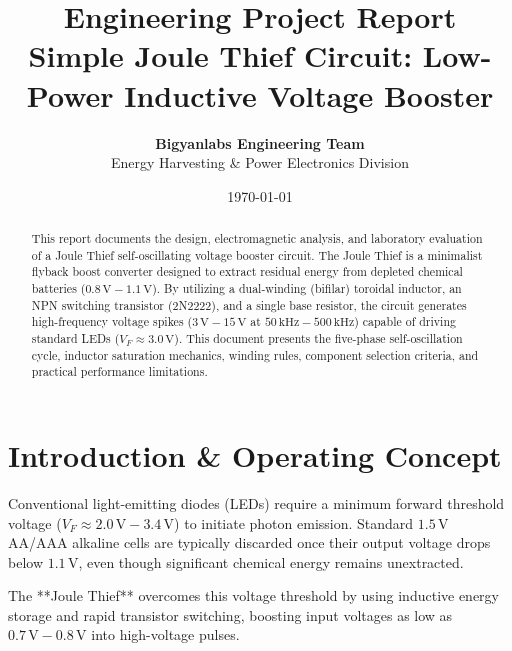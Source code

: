 \documentclass[11pt,a4paper]{article}
\title{\textbf{\Huge Engineering Project Report}\\[0.5em] \Large Simple Joule Thief Circuit: Low-Power Inductive Voltage Booster}
\author{\textbf{Bigyanlabs Engineering Team}\\ Energy Harvesting \& Power Electronics Division}
\date{\today}
\begin{document}
\maketitle
\thispagestyle{empty}

\begin{abstract}
This report documents the design, electromagnetic analysis, and laboratory evaluation of a Joule Thief self-oscillating voltage booster circuit. The Joule Thief is a minimalist flyback boost converter designed to extract residual energy from depleted chemical batteries ($0.8\,\text{V} - 1.1\,\text{V}$). By utilizing a dual-winding (bifilar) toroidal inductor, an NPN switching transistor (2N2222), and a single base resistor, the circuit generates high-frequency voltage spikes ($3\,\text{V} - 15\,\text{V}$ at $50\,\text{kHz} - 500\,\text{kHz}$) capable of driving standard LEDs ($V_F \approx 3.0\,\text{V}$). This document presents the five-phase self-oscillation cycle, inductor saturation mechanics, winding rules, component selection criteria, and practical performance limitations.
\end{abstract}

\newpage
\tableofcontents
\newpage

\section{Introduction \& Operating Concept}
Conventional light-emitting diodes (LEDs) require a minimum forward threshold voltage ($V_F \approx 2.0\,\text{V} - 3.4\,\text{V}$) to initiate photon emission. Standard $1.5\,\text{V}$ AA/AAA alkaline cells are typically discarded once their output voltage drops below $1.1\,\text{V}$, even though significant chemical energy remains unextracted.

The **Joule Thief** overcomes this voltage threshold by using inductive energy storage and rapid transistor switching, boosting input voltages as low as $0.7\,\text{V} - 0.8\,\text{V}$ into high-voltage pulses.
\end{document}
